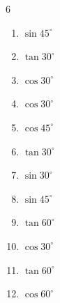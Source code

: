 \begin{multicols}{6}
\begin{enumerate}
        \phantom{$\displaystyle =1$}

  \item $\displaystyle \sin{45^\circ}$


  \item $\displaystyle \tan{30^\circ}$


  \item $\displaystyle \cos{30^\circ}$


  \item $\displaystyle \cos{30^\circ}$


  \item $\displaystyle \cos{45^\circ}$


  \item $\displaystyle \tan{30^\circ}$


  \item $\displaystyle \sin{30^\circ}$


  \item $\displaystyle \sin{45^\circ}$


  \item $\displaystyle \tan{60^\circ}$


  \item $\displaystyle \cos{30^\circ}$


  \item $\displaystyle \tan{60^\circ}$


\columnbreak %

\resetques

  \item $\displaystyle \cos{60^\circ}$


\end{enumerate}
\end{multicols}
